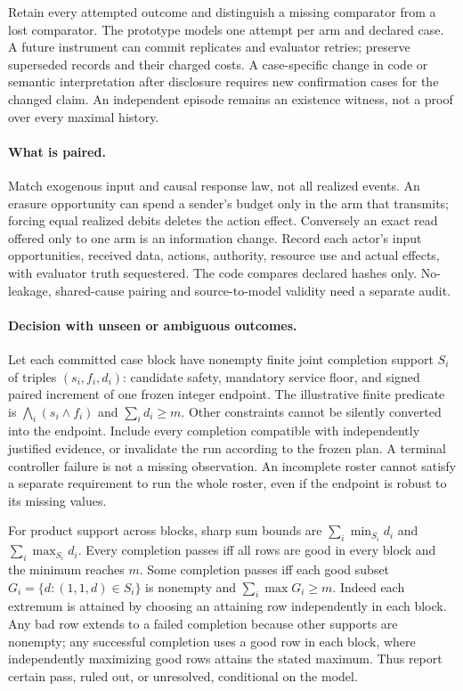 \documentclass{article}
\begin{document}
Retain every attempted outcome and distinguish a missing comparator from a
lost comparator. The prototype models one attempt per arm and declared
case. A future instrument can commit replicates and evaluator retries;
preserve superseded records and their charged costs. A case-specific
change in code or semantic interpretation after disclosure requires new
confirmation cases for the changed claim. An independent episode remains
an existence witness, not a proof over every maximal history.

\paragraph{What is paired.}
Match exogenous input and causal response law, not all realized events.
An erasure opportunity can spend a sender's budget only in the arm that
transmits; forcing equal realized debits deletes the action effect.
Conversely an exact read offered only to one arm is an information change.
Record each actor's input opportunities, received data, actions,
authority, resource use and actual effects, with evaluator truth
sequestered. The code compares declared hashes only. No-leakage,
shared-cause pairing and source-to-model validity need a separate audit.

\paragraph{Decision with unseen or ambiguous outcomes.}
Let each committed case block have nonempty finite joint completion
support \(S_i\) of triples \((s_i,f_i,d_i)\): candidate safety,
mandatory service floor, and signed paired increment of one frozen
integer endpoint. The illustrative finite predicate is
\(\bigwedge_i(s_i\land f_i)\) and \(\sum_i d_i\ge m\).
Other constraints cannot be silently converted into the endpoint.
Include every completion compatible with independently justified
evidence, or invalidate the run according to the frozen plan.
A terminal controller failure is not a missing observation.
An incomplete roster cannot satisfy a separate requirement to run the
whole roster, even if the endpoint is robust to its missing values.

For product support across blocks, sharp sum bounds are
\(\sum_i\min_{S_i}d_i\) and \(\sum_i\max_{S_i}d_i\).
Every completion passes iff all rows are good in every block and the
minimum reaches \(m\). Some completion passes iff each good subset
\(G_i=\{d:(1,1,d)\in S_i\}\) is nonempty and
\(\sum_i\max G_i\ge m\).
Indeed each extremum is attained by choosing an attaining row independently
in each block. Any bad row extends to a failed completion because other
supports are nonempty; any successful completion uses a good row in each
block, where independently maximizing good rows attains the stated maximum.
Thus report certain pass, ruled out, or unresolved, conditional on the model.
\end{document}
